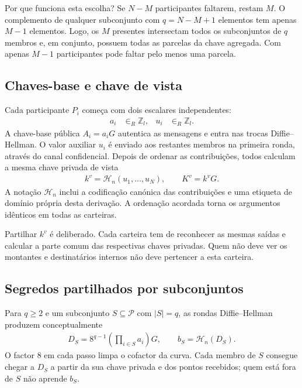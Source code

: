 Por que funciona esta escolha? Se \(N-M\) participantes faltarem, restam
\(M\). O complemento de qualquer subconjunto com \(q=N-M+1\) elementos tem
apenas \(M-1\) elementos. Logo, os \(M\) presentes intersectam todos os
subconjuntos de \(q\) membros e, em conjunto, possuem todas as parcelas da
chave agregada. Com apenas \(M-1\) participantes pode faltar pelo menos uma
parcela.

\subsection{Chaves-base e chave de vista}

Cada participante \(P_i\) começa com dois escalares independentes:
\begin{align*}
 a_i&\in_R\mathbb Z_l, & u_i&\in_R\mathbb Z_l.
\end{align*}
%
A chave-base pública \(A_i=a_iG\) autentica as mensagens e entra nas trocas
Diffie--Hellman. O valor auxiliar \(u_i\) é enviado aos restantes membros na
primeira ronda, através do canal confidencial. Depois de ordenar as
contribuições, todos calculam a mesma chave privada de vista
\begin{align*}
 k^v=\mathcal H_n(u_1,\ldots,u_N),
 \qquad K^v=k^vG.
\end{align*}
A notação \(\mathcal H_n\) inclui a codificação canónica das contribuições
e uma etiqueta de domínio própria desta derivação. A ordenação acordada
torna os argumentos idênticos em todas as carteiras.

%
Partilhar \(k^v\) é deliberado. Cada carteira tem de reconhecer as mesmas
saídas e calcular a parte comum das respectivas chaves privadas. Quem não
deve ver os montantes e destinatários internos não deve pertencer a esta
carteira.

\subsection{Segredos partilhados por subconjuntos}
\label{sec:smaller-thresholds}

Para \(q\geq2\) e um subconjunto \(S\subseteq\mathcal P\) com \(|S|=q\), as rondas
Diffie--Hellman produzem conceptualmente
\begin{align*}
 D_S=8^{q-1}\left(\prod_{i\in S}a_i\right)G,
 \qquad b_S=\mathcal H_n(D_S).
\end{align*}
O factor \(8\) em cada passo limpa o cofactor da curva. Cada membro de \(S\)
consegue chegar a \(D_S\) a partir da sua chave privada e dos pontos
recebidos; quem está fora de \(S\) não aprende \(b_S\).

